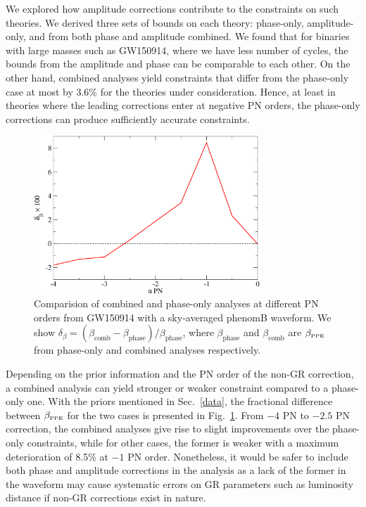 \documentclass[prd,twocolumn,nofootinbib]{revtex4-1}
\newcommand{\lb}{\left(}
\newcommand{\rb}{\right)}
\newcommand{\PPE}{{\mbox{\tiny PPE}}}
\begin{document}
We explored how amplitude corrections contribute to the constraints on such theories. We derived three sets of bounds on each theory: phase-only, amplitude-only, and from both phase and amplitude combined. We found that for binaries with large masses such as GW150914, where we have less number of cycles, the bounds from the amplitude and phase can be comparable to each other. On the other hand, combined analyses yield constraints that differ from the phase-only case at most by 3.6\% for the theories under consideration. Hence, at least in theories where the leading corrections enter at negative PN orders, the phase-only corrections can produce sufficiently accurate constraints.
\begin{figure}[htb]
\includegraphics[width=8.5cm]{combinedvsphase.pdf}
\caption{Comparision of combined and phase-only analyses at different PN orders from GW150914 with a sky-averaged phenomB waveform. We show $\delta_{\beta}=\lb\beta_{\text{comb}}-\beta_{\text{phase}}\rb/\beta_{\text{phase}}$, where $\beta_{\text{phase}}$ and $\beta_{\text{comb}}$ are $\beta_{\PPE}$ from phase-only and combined analyses respectively. }
\label{fig:combinedvsphase}
\end{figure}

Depending on the prior information and the PN order of the non-GR correction, a combined analysis can yield stronger or weaker constraint compared to a phase-only one. With the priors mentioned in Sec.~\ref{data}, the fractional difference between $\beta_{\PPE}$ for the two cases is presented in Fig.~\ref{fig:combinedvsphase}. From $-4$ PN to $-2.5$ PN correction, the combined analyses give rise to slight improvements over the phase-only constraints, while for other cases, the former is weaker with a maximum deterioration of 8.5\% at $-1$ PN order. Nonetheless, it would be safer to include both phase and amplitude corrections in the analysis as a lack of the former in the waveform may cause systematic errors on GR parameters such as luminosity distance if non-GR corrections exist in nature.
\end{document}
